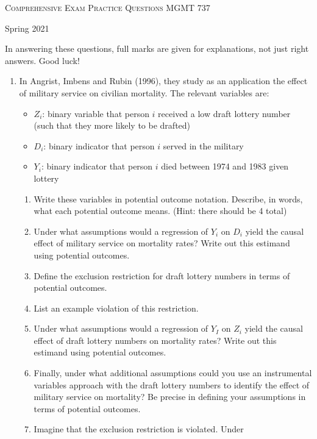 \documentclass[11pt, a4paper]{article}
\begin{document}
\begin{center}
  {\Large \textsc{Comprehensive Exam Practice Questions}}
  MGMT 737
\end{center}
\begin{center}
Spring 2021
\end{center}


In answering these questions, full marks are given for explanations,
not just right answers. Good luck!

\begin{enumerate}
\item In Angrist, Imbens and Rubin (1996), they study as an
  application the effect of military service on civilian
  mortality. The relevant variables are:
  \begin{itemize}
  \item $Z_{i}$: binary variable that person $i$ received a low draft lottery number (such
    that they more likely to be drafted)
  \item $D_{i}$: binary indicator that person $i$ served in the military
  \item $Y_{i}$: binary indicator that person $i$ died between 1974 and 1983 given lottery
  \end{itemize}
  \begin{enumerate}
    \item Write these variables in potential outcome notation. Describe, in words, what each potential outcome means. (Hint: there should be 4 total)
    \item Under what assumptions would a regression of $Y_{i}$ on $D_{i}$ yield the causal effect of military service on mortality rates? Write out this estimand using potential outcomes.
    \item Define the exclusion restriction for draft lottery numbers in terms of potential outcomes.
    \item List an example violation of this restriction.
    \item Under what assumptions would a regression of $Y_{I}$ on $Z_{i}$ yield the causal effect of draft lottery numbers on mortality rates? Write out this estimand using potential outcomes.
    \item Finally, under what additional assumptions could you use an
      instrumental variables approach with the draft lottery numbers
      to identify the effect of military service on mortality? Be
      precise in defining your assumptions in terms of potential
      outcomes.
    \item Imagine that the exclusion restriction is violated. Under

\end{enumerate}
\end{enumerate}
\end{document}
